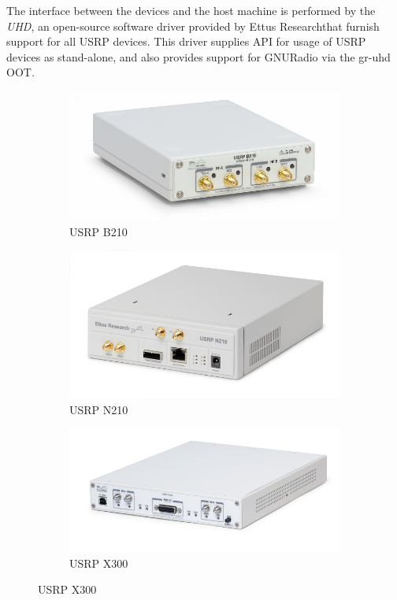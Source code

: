 The interface between the devices and the host machine is performed by the \emph{\ac{UHD}}, an open-source software driver provided by Ettus Research\texttrademark that furnish support for all \ac{USRP} devices. This driver supplies API for usage of \ac{USRP} devices as stand-alone, and also provides support for GNURadio via the gr-uhd \ac{OOT}.

\begin{figure}[htb]
    \centering
    \begin{subfigure}[htb]{0.45\textwidth}
        \centering
        \includegraphics[width=0.7\linewidth]{figures/b210}
        \caption{USRP B210}
        \label{fig:b210}
    \end{subfigure}
    \begin{subfigure}[htb]{0.45\textwidth}
        \centering
        \includegraphics[width=0.7\linewidth]{figures/n210}
        \caption{USRP N210}
        \label{fig:n210}
    \end{subfigure}
    \begin{subfigure}[htb]{0.5\textwidth}
        \centering
        \includegraphics[width=0.7\linewidth]{figures/x310}
        \caption{USRP X300}

\end{subfigure}
\end{figure}
